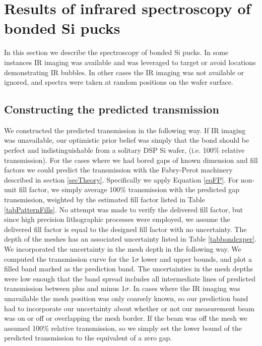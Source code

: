 \documentclass[osajnl,preprint,showpacs,superscriptaddress,12pt]{revtex4-1} %
\begin{document}
\section{Results of infrared spectroscopy of bonded Si pucks}
\label{secResults}
In this section we describe the spectroscopy of bonded Si pucks.  In some instances IR imaging was available and was leveraged to target or avoid locations demonstrating IR bubbles.  In other cases the IR imaging was not available or ignored, and spectra were taken at random positions on the wafer surface.  

\subsection{Constructing the predicted transmission}
We constructed the predicted transmission in the following way.  If IR imaging was unavailable, our optimistic prior belief was simply that the bond should be perfect and indistinguishable from a solitary DSP Si wafer, (i.e. 100\% relative transmission).  For the cases where we had bored gaps of known dimension and fill factors we could predict the transmission with the Fabry-Perot machinery described in section \ref{secTheory}.  Specifically we apply Equation \ref{eqFP}.  For non-unit fill factor, we simply average 100\% transmission with the predicted gap transmission, weighted by the estimated fill factor listed in Table \ref{tabPatternFills}.  No attempt was made to verify the delivered fill factor, but since high precision lithographic processes were employed, we assume the delivered fill factor is equal to the designed fill factor with no uncertainty.  The depth of the meshes has an associated uncertainty listed in Table \ref{tabbondexper}.  We incorporated the uncertainty in the mesh depth in the following way.  We computed the transmission curve for the 1$\sigma$ lower and upper bounds, and plot a filled band marked as the prediction band.  The uncertainties in the mesh depths were low enough that the band spread includes all intermediate lines of predicted transmission between plus and minus 1$\sigma$.  In cases where the IR imaging was unavailable the mesh position was only coarsely known, so our prediction band had to incorporate our uncertainty about whether or not our measurement beam was on or off or overlapping the mesh border.  If the beam was off the mesh we assumed 100\% relative transmission, so we simply set the lower bound of the predicted transmission to the equivalent of a zero gap.  
\end{document}
